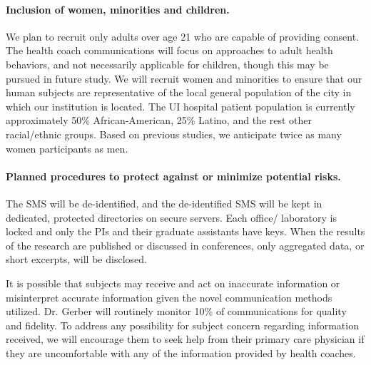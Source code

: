 \paragraph{Inclusion of women, minorities and children.}
We plan to recruit only adults over age 21 who are capable of providing consent. The health coach communications will focus on approaches to adult health behaviors, and not necessarily applicable for children, though this may be pursued in future study.   We will recruit women and minorities to ensure that our human subjects are representative of the local general population of the city in which our institution is located.  The UI hospital patient population is currently approximately 50\% African-American, 25\% Latino, and the rest other racial/ethnic groups. Based on previous studies, we anticipate twice as many women participants as men.

	
  

\paragraph{Planned procedures to protect against or minimize potential risks.} The SMS will be de-identified, and the  de-identified SMS  will be kept in  dedicated, protected directories on secure servers.   Each office/ laboratory is locked and only the PIs and their graduate assistants have keys. 
When the results of the research are published or discussed in
conferences, only aggregated data, or short excerpts, will be disclosed.  %


It is possible that subjects may receive and act on inaccurate information or misinterpret accurate information given the novel communication methods utilized.  Dr. Gerber will routinely monitor 10\% of communications for quality and fidelity. To address any possibility for subject concern regarding information received, we will encourage them to seek help from their primary care physician if they are uncomfortable with any of the information provided by health coaches.

